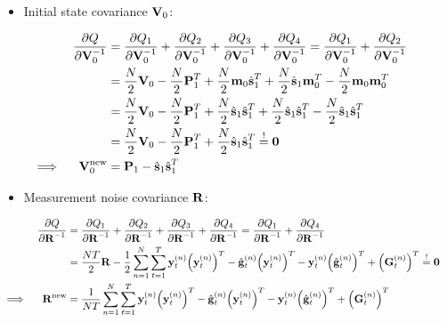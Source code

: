 	\begin{itemize}
		\item Initial state covariance \(\mat{V}_0\):
	\end{itemize}
	\begin{align}
		&&\pdv{Q}{\mat{V}_0^{-1}}
			&= \pdv{Q_1}{\mat{V}_0^{-1}} + \pdv{Q_2}{\mat{V}_0^{-1}} + \pdv{Q_3}{\mat{V}_0^{-1}} + \pdv{Q_4}{\mat{V}_0^{-1}} = \pdv{Q_1}{\mat{V}_0^{-1}} + \pdv{Q_2}{\mat{V}_0^{-1}} & \nonumber \\
		&&	&= \frac{N}{2} \mat{V}_0 - \frac{N}{2} \mat{P}_1^T + \frac{N}{2} \vec{m}_0 \hat{\vec{s}}_1^T + \frac{N}{2} \hat{\vec{s}}_1 \vec{m}_0^T - \frac{N}{2} \vec{m}_0 \vec{m}_0^T & \nonumber \\
		&&	&= \frac{N}{2} \mat{V}_0 - \frac{N}{2} \mat{P}_1^T + \frac{N}{2} \hat{\vec{s}}_1 \hat{\vec{s}}_1^T + \frac{N}{2} \hat{\vec{s}}_1 \hat{\vec{s}}_1^T - \frac{N}{2} \hat{\vec{s}}_1 \hat{\vec{s}}_1^T & \nonumber \\
		&&	&= \frac{N}{2} \mat{V}_0 - \frac{N}{2} \mat{P}_1^T + \frac{N}{2} \hat{\vec{s}}_1 \hat{\vec{s}}_1^T \overset{!}{=} \mat{0} & \nonumber \\
		\implies && \mat{V}_0^\new &= \mat{P}_1 - \hat{\vec{s}}_1 \hat{\vec{s}}_1^T & \label{eq:initialStateCovariance}
	\end{align}

	\begin{itemize}
		\item Measurement noise covariance \(\mat{R}\):
	\end{itemize}
	\begin{align}
		&&\pdv{Q}{\mat{R}^{-1}}
			&= \pdv{Q_1}{\mat{R}^{-1}} + \pdv{Q_2}{\mat{R}^{-1}} + \pdv{Q_3}{\mat{R}^{-1}} + \pdv{Q_4}{\mat{R}^{-1}} = \pdv{Q_1}{\mat{R}^{-1}} + \pdv{Q_4}{\mat{R}^{-1}} & \nonumber \\
		&&	&= \frac{NT}{2} \mat{R} - \frac{1}{2} \sum_{n = 1}^{N} \sum_{t = 1}^{T} \vec{y}_t^{(n)} \Big(\vec{y}_t^{(n)}\Big)^T - \hat{\vec{g}}_t^{(n)} \Big(\vec{y}_t^{(n)}\Big)^T - \vec{y}_t^{(n)} \Big(\hat{\vec{g}}_t^{(n)}\Big)^T + \Big(\mat{G}_t^{(n)}\Big)^T \overset{!}{=} \mat{0} & \nonumber \\
		\implies && \mat{R}^\new &= \frac{1}{NT} \sum_{n = 1}^{N} \sum_{t = 1}^{T} \vec{y}_t^{(n)} \Big(\vec{y}_t^{(n)}\Big)^T - \hat{\vec{g}}_t^{(n)} \Big(\vec{y}_t^{(n)}\Big)^T - \vec{y}_t^{(n)} \Big(\hat{\vec{g}}_t^{(n)}\Big)^T + \Big(\mat{G}_t^{(n)}\Big)^T & \label{eq:measurementNoiseCovariance}
	\end{align}

